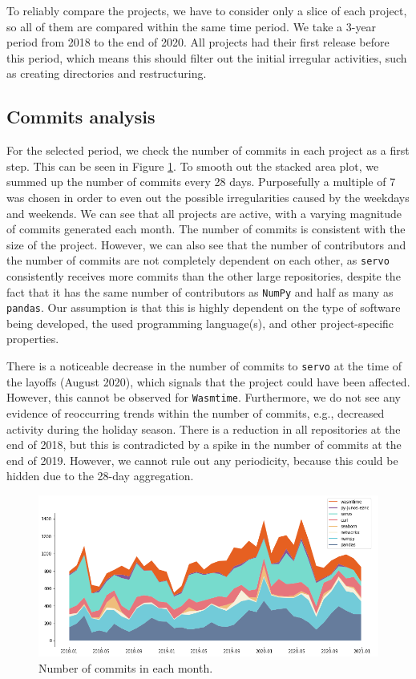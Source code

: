 To reliably compare the projects, we have to consider only a slice of each project, so all of them are compared within the same time period. We take a 3-year period from 2018 to the end of 2020. All projects had their first release before this period, which means this should filter out the initial irregular activities, such as creating directories and restructuring.

\subsection{Commits analysis}

For the selected period, we check the number of commits in each project as a first step. This can be seen in Figure \ref{fig:commits}. To smooth out the stacked area plot, we summed up the number of commits every 28 days. Purposefully a multiple of 7 was chosen in order to even out the possible irregularities caused by the weekdays and weekends. We can see that all projects are active, with a varying magnitude of commits generated each month. The number of commits is consistent with the size of the project. However, we can also see that the number of contributors and the number of commits are not completely dependent on each other, as \texttt{servo} consistently receives more commits than the other large repositories, despite the fact that it has the same number of contributors as \texttt{NumPy} and half as many as \texttt{pandas}. Our assumption is that this is highly dependent on the type of software being developed, the used programming language(s), and other project-specific properties.

There is a noticeable decrease in the number of commits to \texttt{servo} at the time of the layoffs (August 2020), which signals that the project could have been affected. However, this cannot be observed for \texttt{Wasmtime}. Furthermore, we do not see any evidence of reoccurring trends within the number of commits, e.g., decreased activity during the holiday season. There is a reduction in all repositories at the end of 2018, but this is contradicted by a spike in the number of commits at the end of 2019. However, we cannot rule out any periodicity, because this could be hidden due to the 28-day aggregation.

\begin{figure}
    \centering
    \includegraphics[width=\textwidth]{figures/commits.png}
    \caption{Number of commits in each month.}
    \label{fig:commits}
\end{figure}

